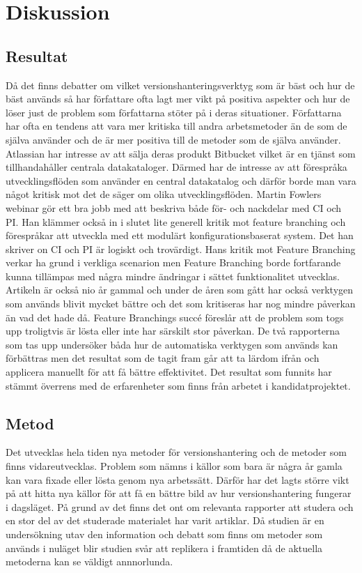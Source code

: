 \section{Diskussion}
\label{sec:bjorn-discussion}



\subsection{Resultat}
\label{subsec:bjorn-discussion-results}
Då det finns debatter om vilket versionshanteringsverktyg som är bäst och hur de bäst används så har författare ofta lagt mer vikt på positiva aspekter och hur de löser just de problem som författarna stöter på i deras situationer. Författarna har ofta en tendens att vara mer kritiska till andra arbetsmetoder än de som de själva använder och de är mer positiva till de metoder som de själva använder.
Atlassian har intresse av att sälja deras produkt Bitbucket vilket är en tjänst som tillhandahåller centrala datakataloger. Därmed har de intresse av att förespråka utvecklingsflöden som använder en central datakatalog och därför borde man vara något kritisk mot det de säger om olika utvecklingsflöden.
Martin Fowlers webinar gör ett bra jobb med att beskriva både för- och nackdelar med CI och PI. Han klämmer också in i slutet lite generell kritik mot feature branching och förespråkar att utveckla med ett modulärt konfigurationsbaserat system. Det han skriver on CI och PI är logiskt och trovärdigt. Hans kritik mot Feature Branching verkar ha grund i verkliga scenarion men Feature Branching borde fortfarande kunna tillämpas med några mindre ändringar i sättet funktionalitet utvecklas. Artikeln är också nio år gammal och under de åren som gått har också verktygen som används blivit mycket bättre och det som kritiseras har nog mindre påverkan än vad det hade då. Feature Branchings succé föreslår att de problem som togs upp troligtvis är lösta eller inte har särskilt stor påverkan.
De två rapporterna som tas upp undersöker båda hur de automatiska verktygen som används kan förbättras men det resultat som de tagit fram går att ta lärdom ifrån och applicera manuellt för att få bättre effektivitet.
Det resultat som funnits har stämmt överrens med de erfarenheter som finns från arbetet i kandidatprojektet.

\subsection{Metod}
\label{subsec:bjorn-discussion-method}
Det utvecklas hela tiden nya metoder för versionshantering och de metoder som finns vidareutvecklas. Problem som nämns i källor som bara är några år gamla kan vara fixade eller lösta genom nya arbetssätt. Därför har det lagts större vikt på att hitta nya källor för att få en bättre bild av hur versionshantering fungerar i dagsläget. På grund av det finns det ont om relevanta rapporter att studera och en stor del av det studerade materialet har varit artiklar.
Då studien är en undersökning utav den information och debatt som finns om metoder som används i nuläget blir studien svår att replikera i framtiden då de aktuella metoderna kan se väldigt annnorlunda.